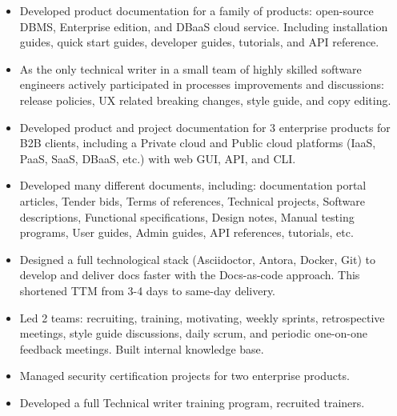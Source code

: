 \documentclass[10pt,a4paper]{altacv}
\begin{document}
\begin{itemize}
\item Developed product documentation for a family of products: open-source DBMS,
Enterprise edition, and DBaaS cloud service. Including installation guides, quick start guides, developer guides, tutorials, and API reference.
\item As the only technical writer in a small team of highly skilled software engineers actively participated in processes improvements and discussions: release policies, UX related breaking changes, style guide, and copy editing.
\end{itemize}
\begin{itemize}
\item Developed product and project documentation for 3 enterprise products for B2B clients, including a Private cloud and Public cloud platforms (IaaS, PaaS, SaaS, DBaaS, etc.) with web GUI, API, and CLI. 
\item Developed many different documents, including: documentation portal articles, Tender bids, Terms of references, Technical projects, Software descriptions, Functional specifications, Design notes, Manual testing programs, User guides, Admin guides, API references, tutorials, etc.
\item Designed a full technological stack (Asciidoctor, Antora, Docker, Git) to develop and deliver docs faster with the Docs-as-code approach. This shortened TTM from 3-4 days to same-day delivery.
\item Led 2 teams: recruiting, training, motivating, weekly sprints, retrospective meetings, style guide discussions, daily scrum, and periodic one-on-one feedback meetings. Built internal knowledge base.
\item Managed security certification projects for two enterprise products.
\end{itemize}
\begin{itemize}
\item Developed a full Technical writer training program, recruited trainers.
\end{itemize}
\end{document}
